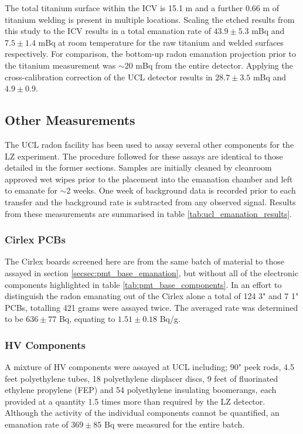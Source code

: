 The total titanium surface within the ICV is 15.1 m\squared{} and a further 0.66 m\squared{} of titanium welding is present in multiple locations. Scaling the etched results from this study to the ICV results in a total emanation rate of $43.9\pm5.3$ mBq and $7.5\pm1.4$ mBq at room temperature for the raw titanium and welded surfaces respectively. For comparison, the bottom-up radon emanation projection prior to the titanium measurement was $\sim20$ mBq from the entire detector. Applying the cross-calibration correction of the UCL detector results in $28.7\pm3.5$ mBq and $4.9\pm0.9$.
%

%


\subsection{Other Measurements}
\label{secsec:other_emanation}

The UCL radon facility has been used to assay several other components for the LZ experiment. The procedure followed for these assays are identical to those detailed in the former sections. Samples are initially cleaned by cleanroom approved wet wipes prior to the placement into the emanation chamber and left to emanate for $\sim2$ weeks. One week of background data is recorded prior to each transfer and the background rate is subtracted from any observed signal. Results from these measurements are summarised in table \ref{tab:ucl_emanation_results}.

\subsubsection{Cirlex PCBs}

The Cirlex boards screened here are from the same batch of material to those assayed in section \ref{secsec:pmt_base_emanation}, but without all of the electronic components highlighted in table \ref{tab:pmt_base_components}. In an effort to distinguish the radon emanating out of the Cirlex alone a total of 124 3" and 7 1" PCBs, totalling 421 grams were assayed twice. The averaged rate was determined to be $636\pm77$ \micro{}Bq, equating to $1.51\pm0.18$ \micro{}Bq/g. 

\subsubsection{HV Components}

A mixture of HV components were assayed at UCL including; 90" peek rods, 4.5 feet polyethylene tubes, 18 polyethylene displacer discs, 9 feet of fluorinated ethylene propylene (FEP) and 54 polyethylene insulating boomerangs, each provided at a quantity 1.5 times more than required by the LZ detector. Although the activity of the individual components cannot be quantified, an emanation rate of $369\pm85$ \micro{}Bq were measured for the entire batch. 

